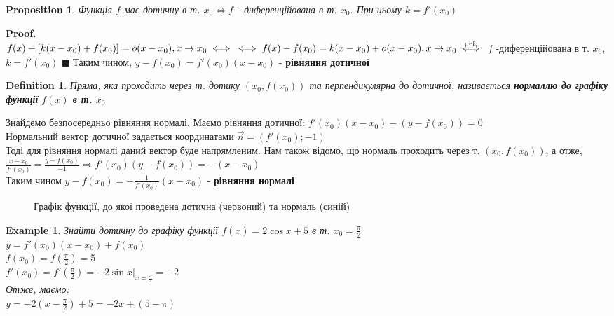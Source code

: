 \documentclass[a4paper, 14pt]{extarticle}
\def\huge{\displaystyle}
\def\bigline{\vspace{5mm}\\}
\theoremstyle{theoremdd}
\theoremstyle{theoremdd}
\newtheorem{definition}[theorem]{Definition}
\theoremstyle{theoremdd}
\theoremstyle{theoremdd}
\newtheorem{example}[theorem]{Example}
\theoremstyle{theoremdd}
\newtheorem{proposition}[theorem]{Proposition}
\theoremstyle{theoremdd}
\theoremstyle{theoremdd}
\theoremstyle{theoremdd}
\newenvironment{pf}{\vspace*{-3mm} \textbf{Proof. \\}}{$\blacksquare$}
\begin{document}
\begin{proposition}
Функція $f$ має дотичну в т. $x_0 \iff f$ - диференційована в т. $x_0$. При цьому $k = f'(x_0)$
\end{proposition}

\begin{pf}
$f(x) - [k(x-x_0)+f(x_0)] = o(x-x_0), x \to x_0 \iff \\ \iff f(x)-f(x_0) = k(x-x_0) + o(x-x_0), x \to x_0 \overset{\textrm{def.}}{\iff}$ $f$ -диференційована в т. $x_0$, $k=f'(x_0)$
\end{pf}
Таким чином, $y - f(x_0) = f'(x_0)(x-x_0)$ - \textbf{рівняння дотичної}

\begin{definition}
Пряма, яка проходить через т. дотику $(x_0, f(x_0))$ та перпендикулярна до дотичної, називається \textbf{нормаллю до графіку функції} $f(x)$ \textbf{в т.} $x_0$
\end{definition}

Знайдемо безпосередньо рівняння нормалі. Маємо рівняння дотичної:
$f'(x_0)(x-x_0) - (y-f(x_0)) = 0$\\
Нормальний вектор дотичної задається координатами $\vec{n} = (f'(x_0); -1)$\\
Тоді для рівняння нормалі даний вектор буде напрямленим. Нам також відомо, що нормаль проходить через т. $(x_0,f(x_0))$, а отже,\\
$\huge \frac{x-x_0}{f'(x_0)} = \frac{y-f(x_0)}{-1} \Rightarrow f'(x_0)(y-f(x_0)) = -(x-x_0)$\\
Таким чином $y-f(x_0) = \huge -\frac{1}{f'(x_0)}(x-x_0)$ - \textbf{рівняння нормалі}
\bigline
\begin{figure}
\centering
{}
	\caption*{Графік функції, до якої проведена дотична (червоний) та нормаль (синій)}
\end{figure}

\begin{example}
Знайти дотичну до графіку функції $f(x) = 2 \cos x + 5$ в т. $x_0 = \huge \frac{\pi}{2}$\\
$y = f'(x_0)(x-x_0)+f(x_0)$\\
$f(x_0) = \huge f(\frac{\pi}{2}) = 5$\\
$f'(x_0) = \huge f'(\frac{\pi}{2}) = -2 \sin x |_{x = \frac{\pi}{2}} = -2$\\
Отже, маємо:\\
$y = \huge -2(x-\frac{\pi}{2}) + 5 = -2x + (5 - \pi)$
\end{example}
\end{document}
